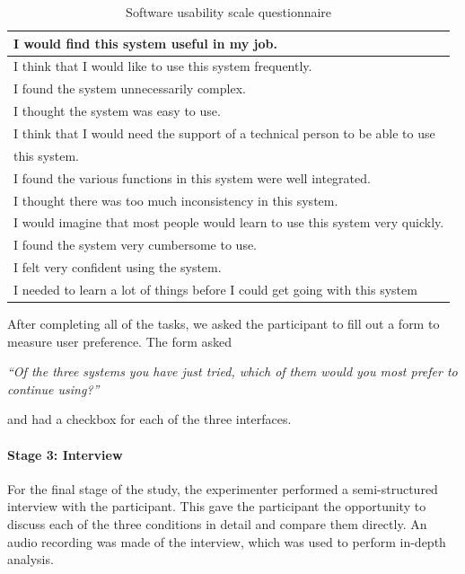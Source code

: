 \begin{table}
  {\small
    \begin{tabular}{ | l | }
      \hline
      I would find this system useful in my job. \\ \hline
      I think that I would like to use this system frequently. \\ \hline
      I found the system unnecessarily complex. \\ \hline
      I thought the system was easy to use. \\ \hline
      I think that I would need the support of a technical person to be able to use \\
      this system. \\ \hline
      I found the various functions in this system were well integrated. \\ \hline
      I thought there was too much inconsistency in this system. \\ \hline
      I would imagine that most people would learn to use this system very quickly. \\ \hline
      I found the system very cumbersome to use. \\ \hline
      I felt very confident using the system. \\ \hline
      I needed to learn a lot of things before I could get going with this system \\
      \hline
    \end{tabular}
  }
  \caption{Software usability scale questionnaire \citep{Brooke1996}}
  \label{tab:sus}
\end{table}

After completing all of the tasks, we asked the participant to fill out a form to measure user preference. The form
asked

\textit{``Of the three systems you have just tried, which of them would you most prefer to continue
using?''}

and had a checkbox for each of the three interfaces.


\paragraph{Stage 3: Interview}

For the final stage of the study, the experimenter performed a semi-structured interview with the participant. This
gave the participant the opportunity to discuss each of the three conditions in detail and compare them directly. An
audio recording was made of the interview, which was used to perform in-depth analysis.

